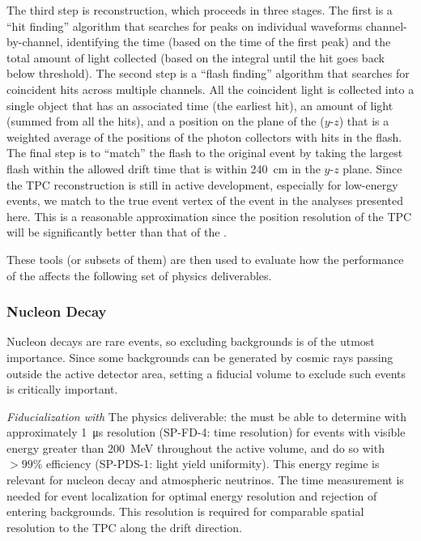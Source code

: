 The third step is reconstruction, which proceeds in three stages. The first is a ``hit finding'' algorithm that searches for peaks on individual waveforms channel-by-channel, identifying the time (based on the time of the first peak) and the total amount of light collected (based on the integral until the hit goes back below threshold). The second step is a ``flash finding'' algorithm that searches for coincident hits across multiple channels. All the coincident light is collected into a single object that has an associated time (the earliest hit), an amount of light (summed from all the hits), and a position on the plane of the  ($y$-$z$) that is a weighted average of the positions of the photon collectors with hits in the flash. %
The final step is to ``match'' the flash to the original event by taking the largest flash within the allowed drift time that is within \SI{240}{cm} in the $y$-$z$ plane. Since the TPC reconstruction is still in active development, especially for low-energy events, we match to the true event %
vertex of the event in the analyses presented here. This is a reasonable approximation since the position resolution of the TPC will be significantly better than that of the . 

These tools (or subsets of them) are then used to evaluate how the performance of the  affects the following set of physics deliverables.

\subsubsection{Nucleon Decay}

Nucleon decays are rare events, so excluding backgrounds is of the utmost importance. Since some backgrounds can be generated by cosmic rays passing outside the active detector area, setting a fiducial volume to exclude such events is critically important.

\textit{Fiducialization with \tzero}
The physics deliverable: the  must be able to determine \tzero with approximately \SI{1}{\micro s} resolution (SP-FD-4: time resolution) for events with visible energy greater than \SI{200}{MeV} throughout the active volume, and do so with $>99\%$ efficiency (SP-PDS-1: light yield uniformity). This energy regime is relevant for nucleon decay and atmospheric neutrinos. The time measurement is needed for event localization for optimal energy resolution and rejection of entering backgrounds. 
This resolution is required for comparable spatial resolution to the TPC along the drift direction.

